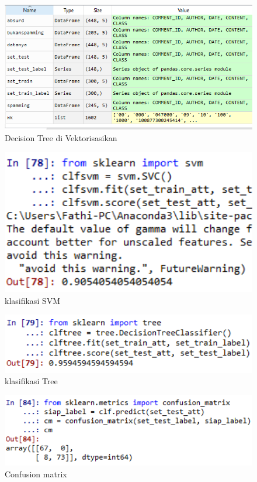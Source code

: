 \begin{figure}[!htbp]
	\centering
	\includegraphics[width=1\textwidth]{figures/fathi/chapter4/hari2/1}
	\caption{Decision Tree di Vektorisasikan}
	\label{b1}
\end{figure}
\begin{figure}[!htbp]
	\centering
	\includegraphics[width=1\textwidth]{figures/fathi/chapter4/hari2/2}
	\caption{klasifikasi SVM}
	\label{b2}
\end{figure}
\begin{figure}[!htbp]
	\centering
	\includegraphics[width=1\textwidth]{figures/fathi/chapter4/hari2/3}
	\caption{klasifikasi Tree}
	\label{b3}
\end{figure}
\begin{figure}[!htbp]
	\centering
	\includegraphics[width=1\textwidth]{figures/fathi/chapter4/hari2/4}
	\caption{Confusion matrix}
	\label{b4}
\end{figure}
